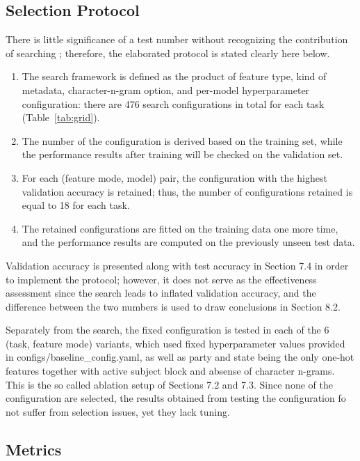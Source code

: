 \subsection{Selection Protocol}

There is little significance of a test number without recognizing the contribution of searching \cite{dodge2019show}; therefore, the elaborated protocol is stated clearly here below.

\begin{enumerate}
\item The search framework is defined as the product of feature type, kind of metadata, character-n-gram option, and per-model hyperparameter configuration: there are 476 search configurations in total for each task (Table~\ref{tab:grid}).
\item The number of the configuration is derived based on the training set, while the performance results after training will be checked on the validation set.
\item For each (feature mode, model) pair, the configuration with the highest validation accuracy is retained; thus, the number of configurations retained is equal to 18 for each task.
\item The retained configurations are fitted on the training data one more time, and the performance results are computed on the previously unseen test data.
\end{enumerate}

Validation accuracy is presented along with test accuracy in Section 7.4 in order to implement the protocol; however, it does not serve as the effectiveness assessment since the search leads to inflated validation accuracy, and the difference between the two numbers is used to draw conclusions in Section 8.2.

Separately from the search, the fixed configuration is tested in each of the 6 (task, feature mode) variants, which used fixed hyperparameter values provided in configs/baseline\_config.yaml, as well as party and state being the only one-hot features together with active subject block and absense of character n-grams. This is the so called ablation setup of Sections 7.2 and 7.3. Since none of the configuration are selected, the results obtained from testing the configuration fo not suffer from selection issues, yet they lack tuning.

\subsection{Metrics}

